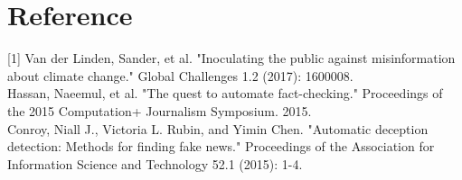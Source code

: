 \documentclass[11pt,a4paper]{article}
\begin{document}
\section*{Reference}
[1] Van der Linden, Sander, et al. "Inoculating the public against misinformation about climate change." Global Challenges 1.2 (2017): 1600008. \\\relax
[2] Hassan, Naeemul, et al. "The quest to automate fact-checking." Proceedings of the 2015 Computation+ Journalism Symposium. 2015.\\\relax
[3] Conroy, Niall J., Victoria L. Rubin, and Yimin Chen. "Automatic deception detection: Methods for finding fake news." Proceedings of the Association for Information Science and Technology 52.1 (2015): 1-4.\\\relax
\end{document}
